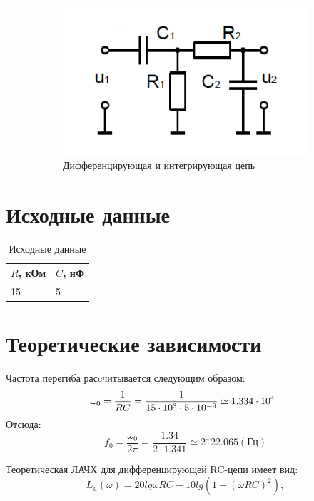 \begin{figure}[h]
\begin{subfigure}[b]{0.3\textwidth}
\includegraphics[scale=0.4]{img/v_scheme.png}
\caption{Дифференцирующая и интегрирующая цепь}\label{figure:2.1:c}
\end{subfigure}
\caption{}\label{figure:2.1}
\end{figure}

\section{Исходные данные}

\begin{table}[H]
	\begin{center}
	\caption{Исходные данные}
	\def\arraystretch{1.5}
		\begin{tabularx}{\textwidth}{|X|X|}
			\hline
			$R$, кОм & $C$, нФ\\\hline
		     15 & 5\\\hline	
		\end{tabularx}
		\label{tabular:11}
	\end{center}
\end{table}

\section{Теоретические зависимости}
Частота перегиба расcчитывается следующим образом:
\begin{equation}
\omega_0 = \frac{1}{RC} = \frac{1}{15 \cdot 10^3 \cdot 5 \cdot 10^{-9}} \simeq 1.334 \cdot 10^4 \hspace*{2mm}
\end{equation}
Отсюда: 
\begin{equation}
f_0 = \frac{\omega_0}{2 \pi} = \frac{1.34}{2\cdot1.341} \simeq 2122.065 (\text{Гц})
\end{equation}

Теоретическая ЛАЧХ для дифференцирующей RC-цепи имеет вид:
\begin{equation}
L_u(\omega) = 20lg \omega RC - 10lg(1+(\omega RC)^2),
\end{equation}

